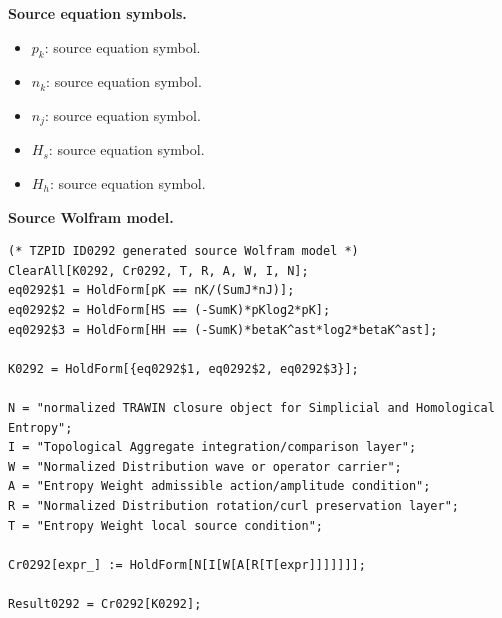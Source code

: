 \begin{minipage}[t]{0.49\linewidth}
\begingroup
\small
\raggedright
\textbf{Source equation symbols.}\par
\begin{itemize}[leftmargin=1.35em,itemsep=1pt,topsep=1pt,parsep=0pt]
    \item $p_k$: source equation symbol.
    \item $n_k$: source equation symbol.
    \item $n_j$: source equation symbol.
    \item $H_s$: source equation symbol.
    \item $H_h$: source equation symbol.
\end{itemize}
\endgroup
\end{minipage}\hfill
\begin{minipage}[t]{0.47\linewidth}
\begingroup
\scriptsize
\raggedright
\textbf{Source Wolfram model.}\par
\begin{Verbatim}[fontsize=\tiny,breaklines=true,breakanywhere=true]
(* TZPID ID0292 generated source Wolfram model *)
ClearAll[K0292, Cr0292, T, R, A, W, I, N];
eq0292$1 = HoldForm[pK == nK/(SumJ*nJ)];
eq0292$2 = HoldForm[HS == (-SumK)*pKlog2*pK];
eq0292$3 = HoldForm[HH == (-SumK)*betaK^ast*log2*betaK^ast];

K0292 = HoldForm[{eq0292$1, eq0292$2, eq0292$3}];

N = "normalized TRAWIN closure object for Simplicial and Homological Entropy";
I = "Topological Aggregate integration/comparison layer";
W = "Normalized Distribution wave or operator carrier";
A = "Entropy Weight admissible action/amplitude condition";
R = "Normalized Distribution rotation/curl preservation layer";
T = "Entropy Weight local source condition";

Cr0292[expr_] := HoldForm[N[I[W[A[R[T[expr]]]]]]];

Result0292 = Cr0292[K0292];
\end{Verbatim}
\endgroup
\end{minipage}

